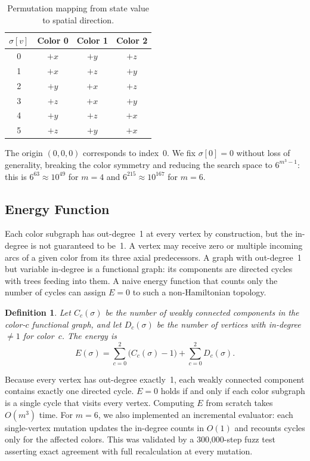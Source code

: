 \documentclass[11pt]{article}
\theoremstyle{plain}
\newtheorem{definition}{Definition}
\begin{document}
\begin{table}[h]
\centering
\caption{Permutation mapping from state value to spatial direction.}
\label{tab:permutations}
\begin{tabular}{@{}cccc@{}}
\toprule
$\sigma[v]$ & Color 0 & Color 1 & Color 2 \\
\midrule
0 & $+x$ & $+y$ & $+z$ \\
1 & $+x$ & $+z$ & $+y$ \\
2 & $+y$ & $+x$ & $+z$ \\
3 & $+z$ & $+x$ & $+y$ \\
4 & $+y$ & $+z$ & $+x$ \\
5 & $+z$ & $+y$ & $+x$ \\
\bottomrule
\end{tabular}
\end{table}

The origin $(0,0,0)$ corresponds to index~0. We fix $\sigma[0] = 0$
without loss of generality, breaking the color symmetry and reducing the
search space to $6^{m^3-1}$: this is $6^{63} \approx 10^{49}$ for
$m=4$ and $6^{215} \approx 10^{167}$ for $m=6$.

\subsection{Energy Function}

Each color subgraph has out-degree~1 at every vertex by construction, but
the in-degree is not guaranteed to be~1. A vertex may receive zero or
multiple incoming arcs of a given color from its three axial predecessors.
A graph with out-degree~1 but variable in-degree is a functional graph:
its components are directed cycles with trees feeding into them. A naive
energy function that counts only the number of cycles can assign $E = 0$
to such a non-Hamiltonian topology.

\begin{definition}
Let $C_c(\sigma)$ be the number of weakly connected components in the
color-$c$ functional graph, and let $D_c(\sigma)$ be the number of vertices
with in-degree $\ne 1$ for color~$c$. The energy is
\[
  E(\sigma) = \sum_{c=0}^{2} \bigl(C_c(\sigma) - 1\bigr)
            + \sum_{c=0}^{2} D_c(\sigma).
\]
\end{definition}

Because every vertex has out-degree exactly~1, each weakly connected
component contains exactly one directed cycle. $E = 0$ holds if and only
if each color subgraph is a single cycle that visits every vertex. Computing $E$ from scratch takes $O(m^3)$ time. For $m=6$,
we also implemented an incremental evaluator: each single-vertex mutation
updates the in-degree counts in $O(1)$ and recounts cycles only for the
affected colors. This was validated by a 300{,}000-step fuzz test asserting
exact agreement with full recalculation at every mutation.
\end{document}
